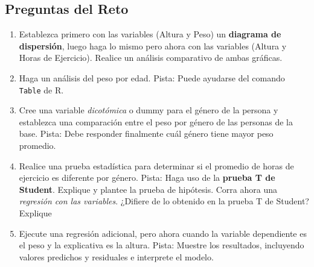 \documentclass[
]{article}
\begin{document}
\subsection{Preguntas del Reto}\label{preguntas-del-reto}

\begin{enumerate}
\def\labelenumi{\arabic{enumi}.}
\item
  Establezca primero con las variables (Altura y Peso) un
  \textbf{diagrama de dispersión}, luego haga lo mismo pero ahora con
  las variables (Altura y Horas de Ejercicio). Realice un análisis
  comparativo de ambas gráficas.
\item
  Haga un análisis del peso por edad. Pista: Puede ayudarse del comando
  \texttt{Table} de R.
\item
  Cree una variable \emph{dicotómica} o dummy para el género de la
  persona y establezca una comparación entre el peso por género de las
  personas de la base. Pista: Debe responder finalmente cuál género
  tiene mayor peso promedio.
\item
  Realice una prueba estadística para determinar si el promedio de horas
  de ejercicio es diferente por género. Pista: Haga uso de la
  \textbf{prueba T de Student}. Explique y plantee la prueba de
  hipótesis. Corra ahora una \emph{regresión con las variables}.
  ¿Difiere de lo obtenido en la prueba T de Student? Explique
\item
  Ejecute una regresión adicional, pero ahora cuando la variable
  dependiente es el peso y la explicativa es la altura. Pista: Muestre
  los resultados, incluyendo valores predichos y residuales e interprete
  el modelo.
\end{enumerate}
\end{document}
